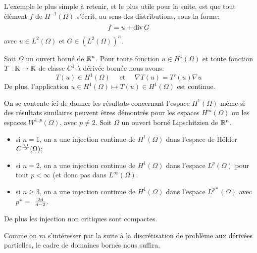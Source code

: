 \medskip
{}

\bigskip
L'exemple le plus simple à retenir, et le plus utile pour la suite, est que tout élément $f$
de $H^{-1}(\Omega)$ s'écrit, au sens des distributions, sous la forme:
\begin{equation}\colorred
f = u + \dive  G
\end{equation}
avec $u \in L^2(\Omega)$ et $G \in (L^2(\Omega))^n$.
\medskip
\begin{theoreme}
Soit $\Omega$ un ouvert borné de $\mathbb R^n$.
Pour toute fonction $u \in H^1(\Omega)$ et toute fonction $T : \mathbb R \to \mathbb R$ de classe
$C^1$ à dérivée bornée nous avons:
\begin{equation}
T(u) \in H^1(\Omega)\quad\text{ et }\quad\nabla T(u) = T'(u)\nabla u
\end{equation}
De plus, l'application $u \in H^1(\Omega) \mapsto T(u) \in H^1(\Omega)$ est continue.
\end{theoreme}
\medskip
On se contente ici de donner les résultats concernant l'espace $H^1(\Omega)$ même
si des résultats similaires peuvent êtres démontrés pour les espaces $H^m(\Omega)$
ou les espaces $W^{1,p}(\Omega)$, avec $p\ne 2$.
Soit $\Omega$ un ouvert borné Lipschitzien de $\mathbb R^n$.
\begin{itemize}
   \item si $n=1$, on a une injection continue de $H^1(\Omega)$ dans l'espace de
	H\"older $C^{0,1\over2}(\Omega)$;
   \item si $n=2$, on a une injection continue de $H^1(\Omega)$ dans l'espace
	$L^p(\Omega)$ pour tout $p<\infty$ (et donc pas dans $L^\infty(\Omega)$.
   \item si $n\ge 3$, on a une injection continue de $H^1(\Omega)$ dans l'espace
	$L^{p*}(\Omega)$ avec $p*=$ ${2d}\over{d-2}$.
\end{itemize}
De plus les injection non critiques sont compactes.

Comme on va s'intéresser par la suite à la discrétisation de problème aux dérivées
partielles, le cadre de domaines bornés nous suffira.

